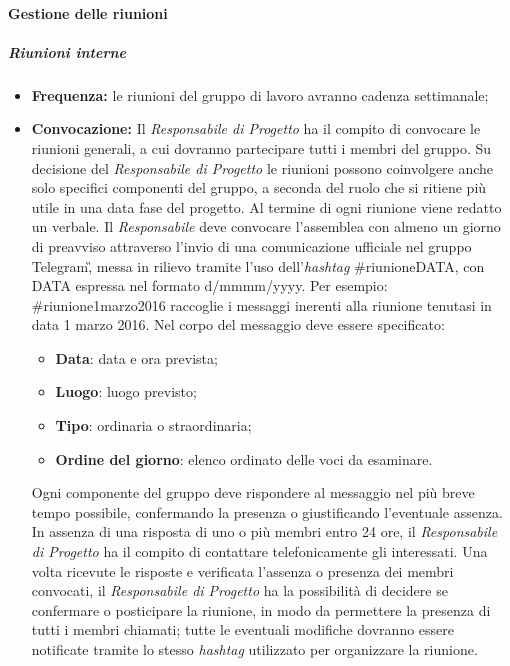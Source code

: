 \paragraph{Gestione delle riunioni}
\subparagraph{Riunioni interne}
\begin{itemize}
\item \textbf{Frequenza:} le riunioni del gruppo di lavoro avranno cadenza settimanale; 

\item \textbf{Convocazione:} Il \textit{Responsabile di Progetto} ha il compito di convocare le riunioni generali, a 
cui dovranno partecipare tutti i membri del gruppo.
Su decisione del \textit{Responsabile di Progetto} le riunioni possono coinvolgere anche 
solo specifici componenti del gruppo, a seconda del ruolo che si ritiene più 
utile in una data fase del progetto. Al termine di ogni riunione viene redatto 
un verbale.
Il \textit{Responsabile} deve convocare l'assemblea con almeno un giorno di preavviso
attraverso l'invio di una comunicazione ufficiale nel gruppo Telegram\G, messa in rilievo tramite l'uso dell'\textit{hashtag} \#riunioneDATA, 
con DATA espressa nel formato d/mmmm/yyyy. Per esempio: \#riunione1marzo2016 raccoglie i messaggi inerenti alla riunione tenutasi in data 1 marzo 2016. Nel corpo del messaggio deve essere specificato:
\begin{itemize}
	\item \textbf{Data}: data e ora prevista;
	\item \textbf{Luogo}: luogo previsto;
	\item \textbf{Tipo}: ordinaria o straordinaria;
	\item \textbf{Ordine del giorno}: elenco ordinato delle voci da esaminare.
\end{itemize}

Ogni componente del gruppo deve rispondere al messaggio nel più breve tempo possibile, confermando la presenza o giustificando l'eventuale assenza. In assenza di una risposta di uno o più membri entro 24 ore, il \textit{Responsabile di Progetto} ha il compito di contattare telefonicamente gli interessati. Una volta ricevute le 
risposte e verificata l'assenza o presenza dei membri convocati, il 
\textit{Responsabile di Progetto} ha la possibilità di decidere se confermare o 
posticipare la riunione, in modo da permettere la presenza di tutti i membri chiamati; 
tutte le eventuali modifiche dovranno essere notificate tramite lo stesso \textit{hashtag} utilizzato per organizzare la riunione. 


\end{itemize}
